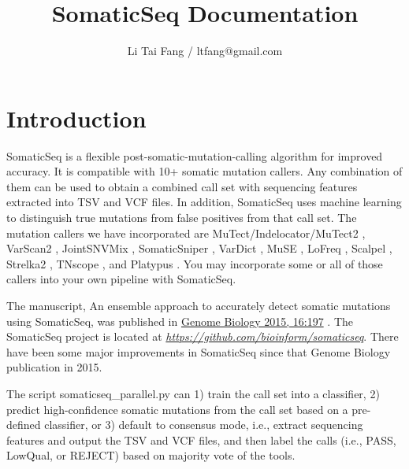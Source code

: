 \documentclass[10pt,letterpaper]{article}
\author{Li Tai Fang / ltfang@gmail.com}
\title{SomaticSeq Documentation}
\begin{document}
\maketitle



\begin{sloppypar}




\tableofcontents


\setlength{\parskip}{\baselineskip}


\section{Introduction} \label{Introduction}

SomaticSeq is a flexible post-somatic-mutation-calling algorithm for improved accuracy. It is compatible with 10+ somatic mutation callers. Any combination of them can be used to obtain a combined call set with sequencing features extracted into TSV and VCF files. In addition, SomaticSeq uses machine learning to distinguish true mutations from false positives from that call set. The mutation callers we have incorporated are MuTect/Indelocator/MuTect2 \cite{mutect}, VarScan2 \cite{varscan2}, JointSNVMix \cite{jointsnvmix2}, SomaticSniper \cite{somaticsniper}, VarDict \cite{vardict}, MuSE \cite{muse}, LoFreq \cite{lofreq}, Scalpel \cite{scalpel}, Strelka2 \cite{strelka2}, TNscope \cite{tnscope}, and Platypus \cite{platypus}. You may incorporate some or all of those callers into your own pipeline with SomaticSeq.


The manuscript, An ensemble approach to accurately detect somatic mutations using SomaticSeq, was published in \href{http://dx.doi.org/10.1186/s13059-015-0758-2}{Genome Biology 2015, 16:197} \cite{Fang_2015}. 
The SomaticSeq project is located at \href{https://github.com/bioinform/somaticseq}{\textit{https://github.com/bioinform/somaticseq}}. 
There have been some major improvements in SomaticSeq since that Genome Biology publication in 2015. 

The script somaticseq\_parallel.py can 1) train the call set into a classifier, 2) predict high-confidence somatic mutations from the call set based on a pre-defined classifier, or 3) default to consensus mode, i.e., extract sequencing features and output the TSV and VCF files, and then label the calls (i.e., PASS, LowQual, or REJECT) based on majority vote of the tools.




\end{sloppypar}
\end{document}
